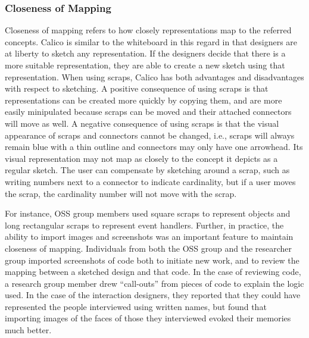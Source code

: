 \subsubsection{Closeness of Mapping}
Closeness of mapping refers to how closely representations map to the referred concepts. Calico is similar to the whiteboard in this regard in that designers are at liberty to sketch any representation. If the designers decide that there is a more suitable representation, they are able to create a new sketch using that representation. When using scraps, Calico has both advantages and disadvantages with respect to sketching. A positive consequence of using scraps is that representations can be created more quickly by copying them, and are more easily minipulated because scraps can be moved and their attached connectors will move as well. A negative consequence of using scraps is that the visual appearance of scraps and connectors cannot be changed, i.e., scraps will always remain blue with a thin outline and connectors may only have one arrowhead. Its visual representation may not map as closely to the concept it depicts as a regular sketch. The user can compensate by sketching around a scrap, such as writing numbers next to a connector to indicate cardinality, but if a user moves the scrap, the cardinality number will not move with the scrap.

For instance, OSS group members used square scraps to represent objects and long rectangular scraps to represent event handlers. Further, in practice, the ability to import images and screenshots was an important feature to maintain closeness of mapping. Individuals from both the OSS group and the researcher group imported screenshots of code both to initiate new work, and to review the mapping between a sketched design and that code. In the case of reviewing code, a research group member drew ``call-outs'' from pieces of code to explain the logic used. In the case of the interaction designers, they reported that they could have represented the people interviewed using written names, but found that importing images of the faces of those they interviewed evoked their memories much better.

%

